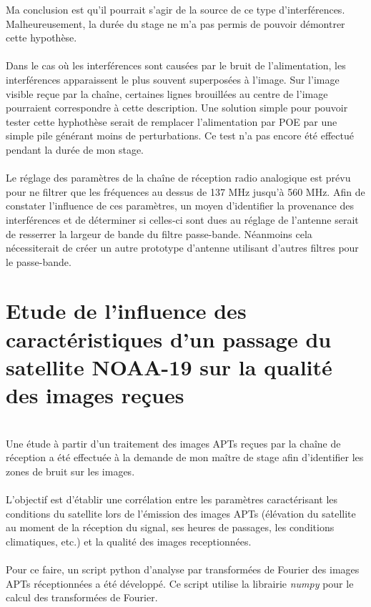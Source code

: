 \documentclass[12pt,fleqn]{book} %
\begin{document}
Ma conclusion est qu'il pourrait s'agir de la source de ce type d'interférences. Malheureusement, la durée du stage ne m'a pas permis de pouvoir démontrer cette hypothèse.
~\\\\Dans le cas où les interférences sont causées par le bruit de l'alimentation, les interférences apparaissent le plus souvent superposées à l'image. Sur l'image visible reçue par la chaîne, certaines lignes brouillées au centre de l'image pourraient correspondre à cette description. Une solution simple pour pouvoir tester cette hyphothèse serait de remplacer l'alimentation par POE par une simple pile générant moins de perturbations.
Ce test n'a pas encore été effectué pendant la durée de mon stage.
~\\\\Le réglage des paramètres de la chaîne de réception radio analogique est prévu pour ne filtrer que les fréquences au dessus de 137 MHz jusqu'à 560 MHz. Afin de constater l'influence de ces paramètres, un moyen d'identifier la provenance des interférences et de déterminer si celles-ci sont dues au réglage de l'antenne serait de resserrer la largeur de bande du filtre passe-bande. Néanmoins cela nécessiterait de créer un autre prototype d'antenne utilisant d'autres filtres pour le passe-bande.
\section{Etude de l'influence des caractéristiques d'un passage du satellite NOAA-19 sur la qualité des images reçues}
~\\\indent Une étude à partir d'un traitement des images APTs reçues par la chaîne de réception a été effectuée à la demande de mon maître de stage afin d'identifier les zones de bruit sur les images.
~\\\\L'objectif est d'établir une corrélation entre les paramètres caractérisant les conditions du satellite lors de l'émission des images APTs (élévation du satellite au moment de la réception du signal, ses heures de passages, les conditions climatiques, etc.) et la qualité des images receptionnées.
~\\\\Pour ce faire, un script python d'analyse par transformées de Fourier des images APTs réceptionnées a été développé. Ce script utilise la librairie \emph{numpy} pour le calcul des transformées de Fourier. 
\end{document}

